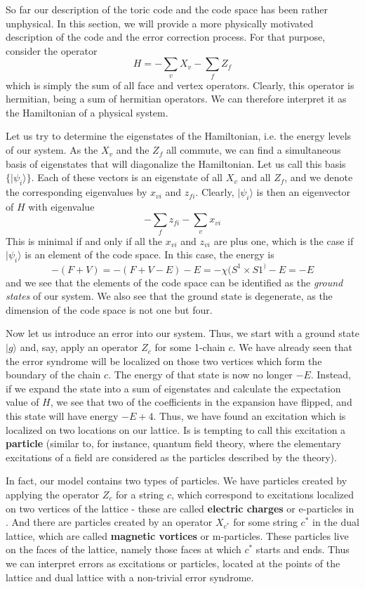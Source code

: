 \documentclass[a4paper, draft]{article}
\theoremstyle{own}
\theoremstyle{remark}
\begin{document}
So far our description of the toric code and the code space has been rather unphysical. In this section, we will provide a more physically motivated description of the code and the error correction process. For that purpose, consider the operator
$$
H = - \sum_v X_v - \sum_f Z_f
$$
which is simply the sum of all face and vertex operators. Clearly, this operator is hermitian, being a sum of hermitian operators. We can therefore interpret it as the Hamiltonian of a physical system.

Let us try to determine the eigenstates of the Hamiltonian, i.e. the energy levels of our system. As the $X_v$ and the $Z_f$ all commute, we can find a simultaneous basis of eigenstates that will diagonalize the Hamiltonian. Let us call this basis $\{ |\psi_i \rangle \}$. Each of these vectors is an eigenstate of all $X_v$ and all $Z_f$, and we denote the corresponding eigenvalues by $x_{vi}$ and $z_{fi}$. Clearly, $|\psi_i \rangle$ is then an eigenvector of $H$ with eigenvalue
$$
- \sum_f z_{fi} - \sum_v x_{vi}
$$
This is minimal if and only if all the $x_{vi}$ and $z_{vi}$ are plus one, which is the case if $|\psi_i \rangle$ is an element of the code space. In this case, the energy is
$$
- (F + V) = - (F + V - E) - E = - \chi(S^1 \times S1^) - E = - E
$$
and we see that the elements of the code space can be identified as the \emph{ground states} of our system. We also see that the ground state is degenerate, as the dimension of the code space is not one but four.

Now let us introduce an error into our system. Thus, we start with a ground state $|g \rangle$ and, say, apply an operator $Z_c$ for some 1-chain $c$. We have already seen that the error syndrome will be localized on those two vertices which form the boundary of the chain $c$. The energy of that state is now no longer $-E$. Instead, if we expand the state into a sum of eigenstates and calculate the expectation value of $H$, we see that two of the coefficients in the expansion have flipped, and this state will have energy $-E + 4$. Thus, we have found an excitation which is localized on two locations on our lattice. Is is tempting to call this excitation a {\bf particle} (similar to, for instance, quantum field theory, where the elementary excitations of a field are considered as the particles described by the theory).

In fact, our model contains two types of particles. We have particles created by applying the operator $Z_c$ for a string $c$, which correspond to excitations localized on two vertices of the lattice - these are called {\bf electric charges} or e-particles in \cite{Kitaev}. And there are particles created by an operator $X_{c^*}$ for some string $c^*$ in the dual lattice, which are called {\bf magnetic vortices} or m-particles. These particles live on the faces of the lattice, namely those faces at which $c^*$ starts and ends. Thus we can interpret errors as excitations or particles, located at the points of the lattice and dual lattice with a non-trivial error syndrome. 
\end{document}
